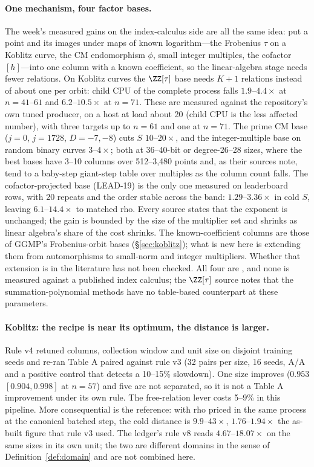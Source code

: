 \paragraph{One mechanism, four factor bases.} The week's measured gains on
the index-calculus side are all the same idea: put a point and its images
under maps of known logarithm---the Frobenius $\tau$ on a Koblitz curve, the
CM endomorphism $\phi$, small integer multiples, the cofactor $[h]$---into
one column with a known coefficient, so the linear-algebra stage needs fewer
relations. On Koblitz curves the $\ZZ[\tau]$ base needs $K+1$ relations
instead of about one per orbit: child CPU of the complete process falls
$1.9$--$4.4\times$ at $n=41$--$61$ and $6.2$--$10.5\times$ at $n=71$. These
are measured against the repository's own tuned producer, on a host at load
about 20 (child CPU is the less affected number), with three targets up to
$n=61$ and one at $n=71$. The prime CM base ($j=0$, $j=1728$, $D=-7,-8$) cuts
$S$ $10$--$20\times$, and the integer-multiple base on random binary curves
$3$--$4\times$; both at 36--40-bit or degree-26--28 sizes, where the best
bases have 3--10 columns over 512--3{,}480 points and, as their sources note,
tend to a baby-step giant-step table over multiples as the column count
falls. The
cofactor-projected base (LEAD-19) is the only one measured on leaderboard
rows, with 20 repeats and the order stable across the band: $1.29$--$3.36\times$
in cold $S$, leaving $6.1$--$14.4\times$ to matched rho. Every source states
that the exponent is unchanged; the gain is bounded by the size of the
multiplier set and shrinks as linear algebra's share of the cost shrinks.
The known-coefficient columns are those of GGMP's Frobenius-orbit bases
\cite{ggmp2020} (\S\ref{sec:koblitz}); what is new here is extending them
from automorphisms to small-norm and integer multipliers. Whether that
extension is in the literature has not been checked. All four are
, and none is measured against a published index
calculus; the $\ZZ[\tau]$ source notes that the summation-polynomial methods
have no table-based counterpart at these parameters.

\paragraph{Koblitz: the recipe is near its optimum, the distance is
larger.} Rule v4 retuned columns, collection window and unit size on
disjoint training seeds and re-ran Table A paired against rule v3 (32 pairs
per size, 16 seeds, A/A and a positive control that detects a 10--15\%
slowdown). One size improves ($0.953$ $[0.904,0.998]$ at $n=57$) and five are
not separated, so it is not a Table A improvement under its own rule. The
free-relation lever costs 5--9\% in this pipeline. More consequential is the
reference: with rho priced in the same process at the canonical batched step,
the cold distance is $9.9$--$43\times$, $1.76$--$1.94\times$ the as-built
figure that rule v3 used. The ledger's rule v8 reads $4.67$--$18.07\times$ on
the same sizes in its own unit; the two are different domains in the sense of
Definition~\ref{def:domain} and are not combined here.

